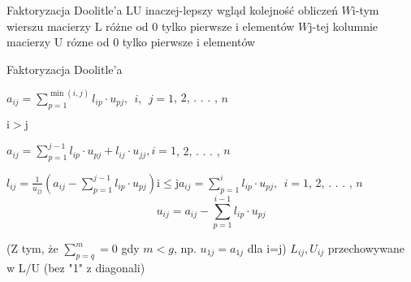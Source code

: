 \begin{frame}{Faktoryzacja Doolitle'a}
LU inaczej-lepszy wgląd kolejność obliczeń
\newline
$W \mathrm{i}$-tym wierszu macierzy $\mathrm{L}$ różne od $0$ tylko pierwsze $\mathrm{i}$ element\'{o}w $W\mathrm{j}$-tej kolumnie macierzy $\mathrm{U}$ r\'{o}zne od $0$ tylko pierwsze $\mathrm{i}$ elementów

\end{frame}
\begin{frame}{Faktoryzacja Doolitle'a}

\begin{center}
$a_{ij}= \displaystyle \sum_{p=1}^{\min(i,j)} l_{ip}\cdot u_{pj}, \ \  i, \ \  j=1$, 2, . . . , $n$

\hspace{55mm}
$\mathrm{i}>\mathrm{j}$


$a_{ij}=\displaystyle \sum_{p=1}^{j-1}l_{ip}\cdot u_{pj}+l_{ij}\cdot u_{jj}, i=1$, 2, . . . , $n$
\end{center}
$l_{ij}=\displaystyle \frac{1}{u_{jj}}(a_{ij}-\sum_{p=1}^{j-1}l_{ip}\cdot u_{pj})\mathrm{i}\leq \mathrm{j}a_{ij}=\sum_{p=1}^{i}l_{ip}\cdot u_{pj}, \ \ i=1$, 2, . . . , $n$
$$
u_{ij}=a_{ij}-\sum_{p=1}^{i-1}l_{ip}\cdot u_{pj}
$$

(Z tym, że $\sum_{p=q}^{m}=0$ gdy $m < g$, np. $u_{1j}=a_{1j}$ dla i=j) \newline
$L_{ij}, U_{ij}$ przechowywane w $\mathrm{L}/\mathrm{U}$ (bez "1" $\mathrm{z}$ diagonali)
\end{frame}
